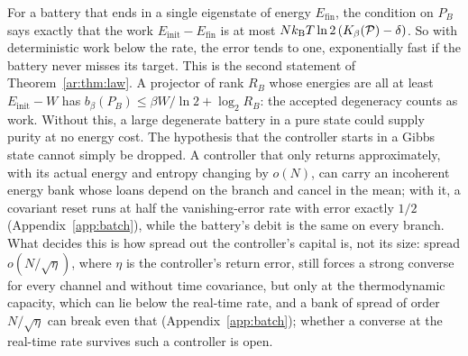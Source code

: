 For a battery that ends in a single eigenstate of energy $E_{\mathrm{fin}}$, the condition on $P_B$ says exactly that the work $E_{\mathrm{init}}-E_{\mathrm{fin}}$ is at most $Nk_{\mathrm B} T\ln2\,(K_\beta(\mathcal P)-\delta)$. So with deterministic work below the rate, the error tends to one, exponentially fast if the battery never misses its target. This is the second statement of Theorem~\ref{ar:thm:law}. A projector of rank $R_B$ whose energies are all at least $E_{\mathrm{init}}-W$ has $b_\beta(P_B)\le\beta W/\ln2+\log_2R_B$: the accepted degeneracy counts as work. Without this, a large degenerate battery in a pure state could supply purity at no energy cost. The hypothesis that the controller starts in a Gibbs state cannot simply be dropped. A controller that only returns approximately, with its actual energy and entropy changing by $o(N)$, can carry an incoherent energy bank whose loans depend on the branch and cancel in the mean; with it, a covariant reset runs at half the vanishing-error rate with error exactly $1/2$ (Appendix~\ref{app:batch}), while the battery's debit is the same on every branch. What decides this is how spread out the controller's capital is, not its size: spread $o(N/\sqrt\eta)$, where $\eta$ is the controller's return error, still forces a strong converse for every channel and without time covariance, but only at the thermodynamic capacity, which can lie below the real-time rate, and a bank of spread of order $N/\sqrt\eta$ can break even that (Appendix~\ref{app:batch}); whether a converse at the real-time rate survives such a controller is open.

